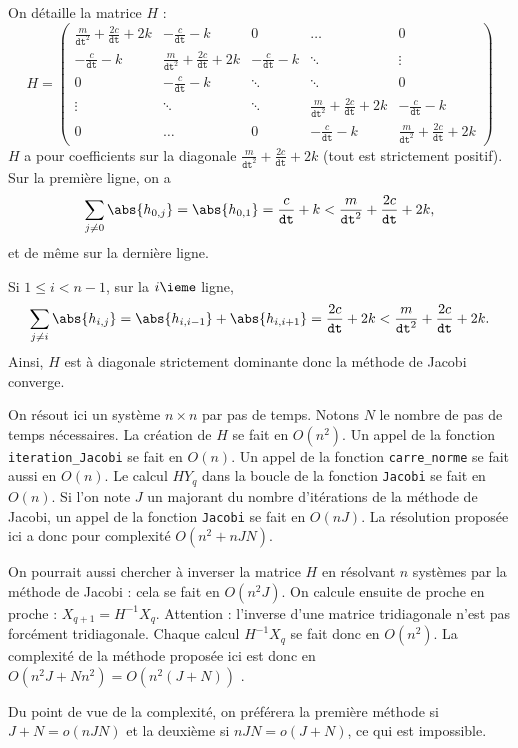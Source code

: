 \question{}
On détaille la matrice $H$ : 
\begin{equation*}
  H = \begin{pmatrix}
        \frac{m}{\texttt{dt}^2} + \frac{2c}{\texttt{dt}} + 2k & -\frac{c}{\texttt{dt}} - k & 0 & \dots & 0 \\
        -\frac{c}{\texttt{dt}} - k                            & \frac{m}{\texttt{dt}^2} + \frac{2c}{\texttt{dt}} + 2k & -\frac{c}{\texttt{dt}} - k & \ddots & \vdots  \\
        0 & -\frac{c}{\texttt{dt}} - k & \ddots & \ddots & 0 \\
        \vdots & \ddots & \ddots &\frac{m}{\texttt{dt}^2} + \frac{2c}{\texttt{dt}} + 2k & -\frac{c}{\texttt{dt}} - k \\
        0 & \dots & 0 & -\frac{c}{\texttt{dt}} - k & \frac{m}{\texttt{dt}^2} + \frac{2c}{\texttt{dt}} + 2k 
      \end{pmatrix}
\end{equation*}
$H$ a pour coefficients sur la diagonale $\frac{m}{\texttt{dt}^2} + \frac{2c}{\texttt{dt}} + 2k$ (tout est strictement positif). 
Sur la première ligne, on a 
\begin{equation*}
  \sum_{j\neq 0} \abs{h_{0,j}} = \abs{h_{0,1}} = \frac{c}{\texttt{dt}} + k < \frac{m}{\texttt{dt}^2} + \frac{2c}{\texttt{dt}} + 2k,
\end{equation*}
et de même sur la dernière ligne.

Si $1 \leq i < n-1$, sur la $i\ieme$ ligne,
\begin{equation*}
  \sum_{j\neq i} \abs{h_{i,j}} = \abs{h_{i,i-1}}+\abs{h_{i,i+1}} = \frac{2c}{\texttt{dt}} + 2k < \frac{m}{\texttt{dt}^2} + \frac{2c}{\texttt{dt}} + 2k.
\end{equation*}
Ainsi, $H$ est à diagonale strictement dominante donc la méthode de Jacobi converge.

\question{} On résout ici un système $n\times n$ par pas de temps.
Notons $N$ le nombre de pas de temps nécessaires. 
La création de $H$ se fait en $O(n^2)$.
Un appel de la fonction \texttt{iteration\_Jacobi} se fait en $O(n)$.
Un appel de la fonction \texttt{carre\_norme} se fait aussi en $O(n)$.
Le calcul $HY_q$ dans la boucle de la fonction \texttt{Jacobi} se fait en $O(n)$.
Si l'on note $J$ un majorant du nombre d'itérations de la méthode de Jacobi, un appel de la fonction \texttt{Jacobi} se fait en $O(nJ)$. 
La résolution proposée ici a donc pour complexité $O(n^2+nJN)$.

On pourrait aussi chercher à inverser la matrice $H$ en résolvant $n$ systèmes par la méthode de Jacobi : cela se fait en $O(n^2J)$. 
On calcule ensuite de proche en proche  : $X_{q+1} = H^{-1}X_q$.
Attention : l'inverse d'une matrice tridiagonale n'est pas forcément tridiagonale. 
Chaque calcul $H^{-1}X_q$ se fait donc en $O(n^2)$. 
La complexité de la méthode proposée ici est donc en $O(n^2J + Nn^2) = O(n^2(J+N))$ . 

Du point de vue de la complexité, on préférera la première méthode si $J+N = o(nJN)$  et la deuxième si $nJN = o(J+N)$, ce qui est impossible.